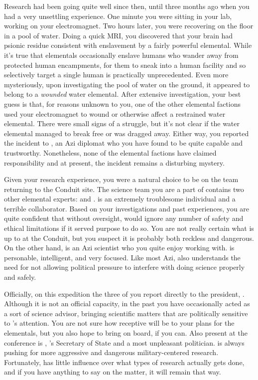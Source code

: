 \documentclass[char]{elementals}
\begin{document}
Research had been going quite well since then, until three months ago when you had a very unsettling experience. One minute you were sitting in your lab, working on your electromagnet. Two hours later, you were recovering on the floor in a pool of water. Doing a quick MRI, you discovered that your brain had psionic residue consistent with enslavement by a fairly powerful elemental. While it's true that elementals occasionally enslave humans who wander away from protected human encampments, for them to sneak into a human facility and so selectively target a single human is practically unprecedented. Even more mysteriously, upon investigating the pool of water on the ground, it appeared to belong to a \emph{wounded} water elemental. After extensive investigation, your best guess is that, for reasons unknown to you, one of the other elemental factions used your electromagnet to wound or otherwise affect a restrained water elemental. There were small signs of a struggle, but it's not clear if the water elemental managed to break free or was dragged away. Either way, you reported the incident to \cDiplomat{\intro}, an Azi diplomat who you have found to be quite capable and trustworthy. Nonetheless, none of the elemental factions have claimed responsibility and at present, the incident remains a disturbing mystery.

Given your research experience, you were a natural choice to be on the team returning to the Conduit site. The science team you are a part of contains two other elemental experts: \cMS{\intro} and \cScientist{\intro}. \cMS{} is an extremely troublesome individual and a terrible collaborator. Based on your investigations and past experiences, you are quite confident that without oversight, \cMS{\they} would ignore any number of safety and ethical limitations if it served \cMS{\their} purpose to do so. You are not really certain what \cMS{\they} is up to at the Conduit, but you suspect it is probably both reckless and dangerous. On the other hand, \cScientist{} is an Azi scientist who you quite enjoy working with. \cScientist{\They} is personable, intelligent, and very focused. Like most Azi, \cScientist{\they} also understands the need for not allowing political pressure to interfere with doing science properly and safely.

Officially, on this expedition the three of you report directly to the president, \cLeader{\intro}. Although it is not an official capacity, in the past you have occasionally acted as a sort of science advisor, bringing scientific matters that are politically sensitive to \cLeader{}'s attention. You are not sure how receptive \cLeader{\they} will be to your plans for the elementals, but you also hope to bring \cLeader{\them} on board, if you can. Also present at the conference is \cDema{\intro}, \cLeader{}'s Secretary of State and a most unpleasant politician. \cDema{\They} is always pushing for more aggressive and dangerous military-centered research. Fortunately, \cDema{\they} has little influence over what types of research actually gets done, and if you have anything to say on the matter, it will remain that way.
\end{document}

